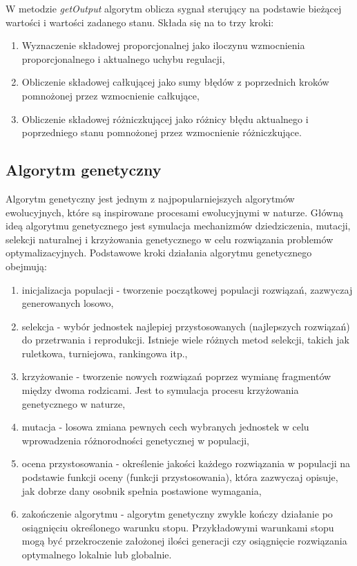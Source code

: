 \documentclass[12pt,twoside]{article}
\begin{document}
W metodzie \textit{getOutput} algorytm oblicza sygnał sterujący na podstawie bieżącej wartości i wartości zadanego stanu. Składa się na to trzy kroki:

\begin{enumerate}[label=\alph*), leftmargin=1.25cm]
	\item Wyznaczenie składowej proporcjonalnej jako iloczynu wzmocnienia proporcjonalnego i aktualnego uchybu regulacji,
	
	\item Obliczenie składowej całkującej jako sumy błędów z poprzednich kroków pomnożonej przez wzmocnienie całkujące,
	
	\item Obliczenie składowej różniczkującej jako różnicy błędu aktualnego i poprzedniego stanu pomnożonej przez wzmocnienie różniczkujące. 
	
\end{enumerate}

\subsection{Algorytm genetyczny}
Algorytm genetyczny jest jednym z najpopularniejszych algorytmów ewolucyjnych, które są inspirowane procesami ewolucyjnymi w naturze. Główną ideą algorytmu genetycznego jest symulacja mechanizmów dziedziczenia, mutacji, selekcji naturalnej i krzyżowania genetycznego w celu rozwiązania problemów optymalizacyjnych.
Podstawowe kroki działania algorytmu genetycznego obejmują:
\begin{enumerate}[label=\alph*), leftmargin=1.25cm]
	\item inicjalizacja populacji - tworzenie początkowej populacji rozwiązań, zazwyczaj generowanych losowo,
	
	\item selekcja - wybór jednostek najlepiej przystosowanych (najlepszych rozwiązań) do przetrwania i reprodukcji. Istnieje wiele różnych metod selekcji, takich jak ruletkowa, turniejowa, rankingowa itp.,
	
	\item krzyżowanie - tworzenie nowych rozwiązań poprzez wymianę fragmentów między dwoma rodzicami. Jest to symulacja procesu krzyżowania genetycznego w naturze,
	
	\item mutacja - losowa zmiana pewnych cech wybranych jednostek w celu wprowadzenia różnorodności genetycznej w populacji,
	
	\item ocena przystosowania - określenie jakości każdego rozwiązania w populacji na podstawie funkcji oceny (funkcji przystosowania), która zazwyczaj opisuje, jak dobrze dany osobnik spełnia postawione wymagania,
	
	\item zakończenie algorytmu - algorytm genetyczny zwykle kończy działanie po osiągnięciu określonego warunku stopu. Przykładowymi warunkami stopu mogą być przekroczenie założonej ilości generacji czy osiągnięcie rozwiązania optymalnego lokalnie lub globalnie. \\
	
\end{enumerate}
\end{document}
